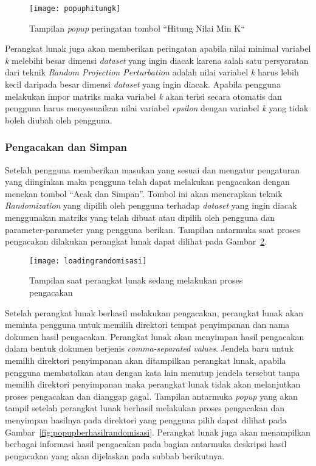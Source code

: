 \begin{figure}
	\centering
	\texttt{[image: popuphitungk]}
	\caption{Tampilan \textit{popup} peringatan tombol \textquotedblleft Hitung Nilai Min K\textquotedblleft }
	\label{fig:popuphitungk}
\end{figure}

Perangkat lunak juga akan memberikan peringatan apabila nilai minimal variabel \textit{k} melebihi besar dimensi \textit{dataset} yang ingin diacak karena salah satu persyaratan dari teknik \textit{Random Projection Perturbation} adalah nilai variabel \textit{k} harus lebih kecil daripada besar dimensi \textit{dataset} yang ingin diacak. Apabila pengguna melakukan impor matriks maka variabel \textit{k} akan terisi secara otomatis dan pengguna harus menyesuaikan nilai variabel \textit{epsilon} dengan variabel \textit{k} yang tidak boleh diubah oleh pengguna. 

\subsubsection{Pengacakan dan Simpan}
\label{subsubsec:randomisasisimpan}

Setelah pengguna memberikan masukan yang sesuai dan mengatur pengaturan yang diinginkan maka pengguna telah dapat melakukan pengacakan dengan menekan tombol \textquotedblleft Acak dan Simpan\textquotedblright. Tombol ini akan menerapkan teknik \textit{Randomization} yang dipilih oleh pengguna terhadap \textit{dataset} yang ingin diacak menggunakan matriks yang telah dibuat atau dipilih oleh pengguna dan parameter-parameter yang pengguna berikan. Tampilan antarmuka saat proses pengacakan dilakukan perangkat lunak dapat dilihat pada Gambar~\ref{fig:loadingrandomisasi}.

\begin{figure}
	\centering
	\texttt{[image: loadingrandomisasi]}
	\caption{Tampilan saat perangkat lunak sedang melakukan proses pengacakan}
	\label{fig:loadingrandomisasi}
\end{figure}

Setelah perangkat lunak berhasil melakukan pengacakan, perangkat lunak akan meminta pengguna untuk memilih direktori tempat penyimpanan dan nama dokumen hasil pengacakan. Perangkat lunak akan menyimpan hasil pengacakan dalam bentuk dokumen berjenis \textit{comma-separated values}. Jendela baru untuk memilih direktori penyimpanan akan ditampilkan perangkat lunak, apabila pengguna membatalkan atau dengan kata lain menutup jendela tersebut tanpa memilih direktori penyimpanan maka perangkat lunak tidak akan melanjutkan proses pengacakan dan dianggap gagal. Tampilan antarmuka \textit{popup} yang akan tampil setelah perangkat lunak berhasil melakukan proses pengacakan dan menyimpan hasilnya pada direktori yang pengguna pilih dapat dilihat pada Gambar~\ref{fig:popupberhasilrandomisasi}. Perangkat lunak juga akan menampilkan berbagai informasi hasil pengacakan pada bagian antarmuka deskripsi hasil pengacakan yang akan dijelaskan pada subbab berikutnya.

